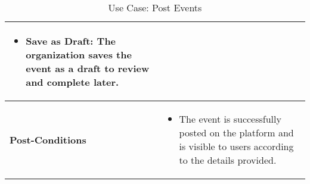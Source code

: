 \begin{table}[!ht]
\begin{tabularx}{\textwidth}{|l|X|}
\begin{itemize}[label=--,itemsep=0pt]
            \item Save as Draft: The organization saves the event as a draft to review and complete later.
        \end{itemize} \\
        \hline
        \textbf{Post-Conditions} & 
        \begin{itemize}[label=--,itemsep=0pt]
            \item The event is successfully posted on the platform and is visible to users according to the details provided.
        \end{itemize} \\
        \hline
    \end{tabularx}
    \caption{Use Case: Post Events}
    \label{tab:use-case-post-events}
\end{table}


